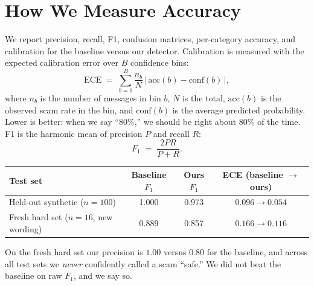 \documentclass[11pt]{article}
\begin{document}
\section*{How We Measure Accuracy}
We report precision, recall, F1, confusion matrices, per-category accuracy, and calibration for the baseline versus our detector. Calibration is measured with the expected calibration error over $B$ confidence bins:
\begin{equation}
  \mathrm{ECE} \;=\; \sum_{b=1}^{B} \frac{n_b}{N}\,\bigl|\,\mathrm{acc}(b) - \mathrm{conf}(b)\,\bigr| ,
\end{equation}
where $n_b$ is the number of messages in bin $b$, $N$ is the total, $\mathrm{acc}(b)$ is the observed scam rate in the bin, and $\mathrm{conf}(b)$ is the average predicted probability. Lower is better: when we say ``80\%,'' we should be right about 80\% of the time. F1 is the harmonic mean of precision $P$ and recall $R$:
\begin{equation}
  F_1 \;=\; \frac{2PR}{P + R}.
\end{equation}

\begin{center}
\begin{tabular}{lccc}
\toprule
Test set & Baseline $F_1$ & Ours $F_1$ & ECE (baseline $\to$ ours) \\
\midrule
Held-out synthetic ($n=100$) & 1.000 & 0.973 & $0.096 \to 0.054$ \\
Fresh hard set ($n=16$, new wording) & 0.889 & 0.857 & $0.166 \to 0.116$ \\
\bottomrule
\end{tabular}
\end{center}

On the fresh hard set our precision is $1.00$ versus $0.80$ for the baseline, and across all test sets we \emph{never} confidently called a scam ``safe.'' We did not beat the baseline on raw $F_1$, and we say so.
\end{document}
